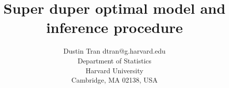\documentclass[twoside,11pt]{article}
\begin{document}
\title{Super duper optimal model and inference procedure}
\author{\name Dustin Tran \email dtran@g.harvard.edu\\
\addr Department of Statistics\\
Harvard University\\
Cambridge, MA 02138, USA
}

\editor{}

\maketitle
\begin{abstract}%
\end{abstract}

\nocite{*}

\end{document}
